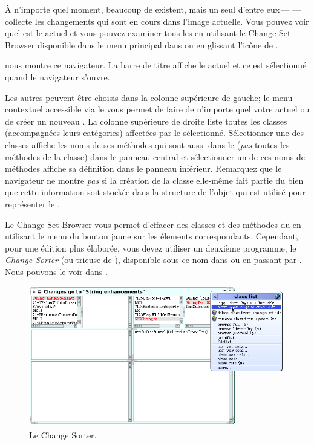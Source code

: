 \documentclass[a4paper,10pt,twoside]{book}
\begin{document}
\`A n'importe quel moment, beaucoup de \changesets existent, mais un seul d'entre eux\,---\,\,---\,collecte les changements qui sont en cours dans l'image actuelle.
Vous pouvez voir quel \changeset est le \changeset actuel et vous pouvez examiner
tous les \changesets en utilisant le Change Set Browser disponible dans le menu
principal dans  ou en glissant l'ic\^one
 de \toolsflapind.

 nous montre ce navigateur. La barre de titre affiche le \changeset actuel et ce \changeset est s\'electionn\'e quand le navigateur s'ouvre.

Les autres \changesets peuvent \^etre choisis dans la colonne sup\'erieure de gauche;
le menu contextuel accessible via le  vous permet de faire de
n'importe quel \changeset votre \changeset actuel ou de cr\'eer un nouveau \changeset.
La colonne sup\'erieure de droite liste toutes les classes 
(accompagn\'ees leurs cat\'egories) affect\'ees par le \changeset s\'electionn\'e.
S\'electionner une des classes affiche les noms de ses m\'ethodes qui sont aussi dans
le \changeset (\emph{pas} toutes les m\'ethodes de la classe) dans le panneau central
et s\'electionner un de ces noms de m\'ethodes affiche sa d\'efinition dans le panneau
inf\'erieur.
Remarquez que le navigateur ne montre \emph{pas} si la cr\'eation de la classe elle-m\^eme
fait partie du \changeset bien que cette information soit stock\'ee dans la structure
de l'objet qui est utilis\'e pour repr\'esenter le \changeset.

Le Change Set Browser vous permet d'effacer des classes et des m\'ethodes du \changeset
en utilisant le menu du bouton jaune sur les \'elements correspondants. 
Cependant, pour une \'edition plus \'elabor\'ee, vous devez utiliser un deuxi\`eme
programme, le \textit{Change Sorter} (ou trieuse de \changeset), disponible sous ce nom dans 
\toolsflap ou en passant par . Nous
pouvons le voir dans .

\begin{figure}[btp]
	\begin{center}
		\includegraphics[width=\linewidth]{changeSorter}
	\end{center}
	\caption{Le Change Sorter.}
	\label{fig:changeSorter}
\end{figure}
\end{document}
